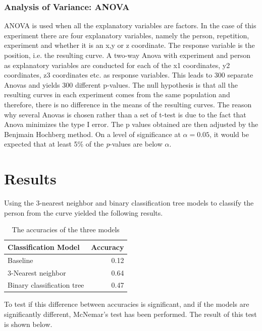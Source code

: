 \documentclass[11pt, fleqn, titlepage]{article}
\begin{document}
\subsubsection*{Analysis of Variance: ANOVA}
ANOVA is used when all the explanatory variables are factors. In the case of this experiment there are four explanatory variables, namely the person, repetition, experiment and whether it is an x,y or z coordinate. The response variable is the position, i.e. the resulting curve. A two-way Anova with experiment and person as explanatory variables are conducted for each of the x1 coordinates, y2 coordinates, z3 coordinates etc. as response variables. This leads to 300 separate Anovas and yields 300 different p-values. The null hypothesis is that all the resulting curves in each experiment comes from the same population and therefore, there is no difference in the means of the resulting curves. The reason why several Anovas is chosen rather than a set of t-test is due to the fact that Anova minimizes the type I error. The p values obtained are then adjusted by the Benjmain Hochberg method. On a level of significance at $ \alpha = 0.05 $, it would be expected that at least 5\% of the \textit{p}-values are below $ \alpha $. \cite{statbog}


\section{Results}
Using the 3-nearest neighbor and binary classification tree models to classify the person from the curve yielded the following results.

\begin{table}[h]
	\centering
	\begin{tabular}{l r}
		\toprule
		Classification Model       & Accuracy  \\ \midrule
		Baseline                   & 0.12      \\
		3-Nearest neighbor         & 0.64      \\ 
		Binary classification tree & 0.47      \\ \bottomrule
	\end{tabular}
\caption{The accuracies of the three models}
\label{accuracies}
\end{table}

\noindent To test if this difference between accuracies is significant, and if the models are significantly different, McNemar's test has been performed. The result of this test is shown below.
\end{document}
